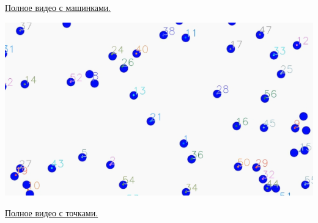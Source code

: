 \href{https://drive.google.com/file/d/1x0Y_jIFEGzIxii0dknu8mWWziKoa_wCL/view?usp=drive_link}{Полное видео с машинками.}

\includegraphics[scale=0.35]{white.png}

\href{https://drive.google.com/file/d/16_cmGNeH45PxP-VW5EQzEFFCMhzUTwx8/view?usp=drive_link}{Полное видео с точками.}
